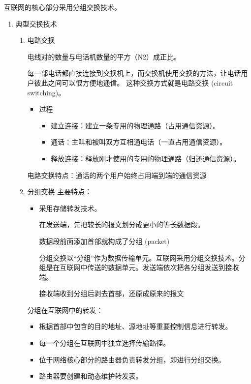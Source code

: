 \documentclass[11pt]{article}
\begin{document}
互联网的核心部分采用分组交换技术。
\begin{enumerate}
\item 典型交换技术
\label{sec:orgdb5969a}

\begin{enumerate}
\item 电路交换

电线对的数量与电话机数量的平方（N2）成正比。

每一部电话都直接连接到交换机上，而交换机使用交换的方法，让电话用户彼此之间可以很方便地通信。 这种交换方式就是电路交换 (circuit switching)。

\begin{itemize}
\item 过程
\begin{itemize}
\item 建立连接：建立一条专用的物理通路（占用通信资源）。

\item 通话：主叫和被叫双方互相通电话（一直占用通信资源）。

\item 释放连接：释放刚才使用的专用的物理通路（归还通信资源）。
\end{itemize}
\end{itemize}

电路交换特点：通话的两个用户始终占用端到端的通信资源
\item 分组交换
主要特点：
\begin{itemize}
\item 采用存储转发技术。

在发送端，先把较长的报文划分成更小的等长数据段。

数据段前面添加首部就构成了分组 (packet)

分组交换以“分组”作为数据传输单元。互联网采用分组交换技术。分组是在互联网中传送的数据单元。发送端依次把各分组发送到接收端。

接收端收到分组后剥去首部，还原成原来的报文
\end{itemize}
分组在互联网中的转发：
\begin{itemize}
\item 根据首部中包含的目的地址、源地址等重要控制信息进行转发。

\item 每一个分组在互联网中独立选择传输路径。

\item 位于网络核心部分的路由器负责转发分组，即进行分组交换。

\item 路由器要创建和动态维护转发表。
\end{itemize}


\end{enumerate}
\end{enumerate}
\end{document}
